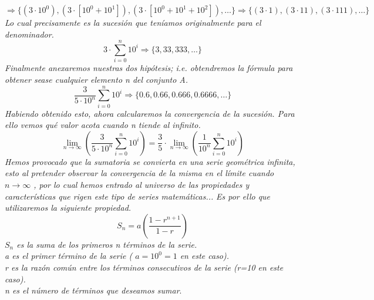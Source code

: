 \documentclass{article}
\begin{document}
\[ \Rightarrow \{(3 \cdot 10^0),(3 \cdot [10^0+10^1]),(3 \cdot [10^0+10^1+10^2]),\ldots\} \Rightarrow \{ (3 \cdot 1),(3 \cdot 11),(3 \cdot 111),\ldots   \}  \]
\textit{Lo cual precisamente es la sucesión que teníamos originalmente para el denominador.}
\[ 3 \cdot \sum_{i=0}^n 10^i \Rightarrow \{ 3, 33, 333, \ldots \} \]
\textit{Finalmente anexaremos nuestras dos hipótesis; i.e. obtendremos la fórmula para obtener sease cualquier elemento n del conjunto A.}
\[ \frac{3}{5 \cdot 10^n}\sum\limits_{i=0}^n 10^i \Rightarrow \{0.6,0.66,0.666,0.6666,\ldots\} \]
\textit{Habiendo obtenido esto, ahora calcularemos la convergencia de la sucesión. Para ello vemos qué valor acota cuando n tiende al infinito.}
\[ \lim_{n \to \infty} \left( \frac{3}{5 \cdot 10^n}\sum\limits_{i=0}^n 10^i \right) = \frac{3}{5} \cdot \lim_{n \to \infty} \left( \frac{1}{10^n}\sum\limits_{i=0}^n 10^i \right) \]
\textit{Hemos provocado que la sumatoria se convierta en una serie geométrica infinita, esto al pretender observar la convergencia de la misma en el límite cuando \(n \to \infty\) , por lo cual hemos entrado al universo de las propiedades y características que rigen este tipo de series matemáticas...} \newpage
\noindent \textit{Es por ello que utilizaremos la siguiente propiedad.}
\[ S_n = a \left( \frac{1-r^{n+1}}{1-r} \right) \]
\textit{\(S_n\) es la suma de los primeros n términos de la serie. \\
a es el primer término de la serie ( \(a = 10^0 = 1\) en este caso). \\
r es la razón común entre los términos consecutivos de la serie (r=10 en este caso). \\
n es el número de términos que deseamos sumar}.\\\\
\end{document}
